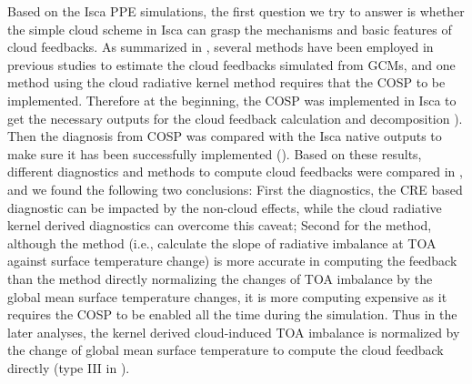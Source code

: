 Based on the Isca PPE simulations, the first question we try to answer is whether the simple cloud scheme in Isca can grasp the mechanisms and basic features of cloud feedbacks. As summarized in , several methods have been employed in previous studies to estimate the cloud feedbacks simulated from GCMs, and one method using the cloud radiative kernel method \citep{Zelinka2012computing1,Zelinka2012computing2} requires that the COSP \citep{BodasSalcedo2011,Swales2018} to be implemented. Therefore at the beginning, the COSP was implemented in Isca to get the necessary outputs for the cloud feedback calculation and decomposition ). Then the diagnosis from COSP was compared with the Isca native outputs to make sure it has been successfully implemented (). Based on these results, different diagnostics and methods to compute cloud feedbacks were compared in , and we found the following two conclusions: First the diagnostics, the CRE based diagnostic can be impacted by the non-cloud effects, while the cloud radiative kernel derived diagnostics can overcome this caveat; Second for the method, although the \cite{Gregory2004} method (i.e., calculate the slope of radiative imbalance at TOA against surface temperature change) is more accurate in computing the feedback than the method directly normalizing the changes of TOA imbalance by the global mean surface temperature changes, it is more computing expensive as it requires the COSP to be enabled all the time during the simulation. Thus in the later analyses, the kernel derived cloud-induced TOA imbalance is normalized by the change of global mean surface temperature to compute the cloud feedback directly (type III in ).


